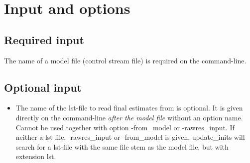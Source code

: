 \section{Input and options}

\subsection{Required input}
The name of a model file (control stream file) is required on the command-line.

\subsection{Optional input}
\begin{itemize}
\item The name of the lst-file to read final estimates from is optional. It is given directly on 
the command-line \emph{after the model file} without an option name.
Cannot be used together with option -from\_model or -rawres\_input. 
If neither a lst-file, -rawres\_input or -from\_model is given, 
update\_inits will search for a lst-file with the same file stem as the model file, 
but with extension lst.
\end{itemize}

